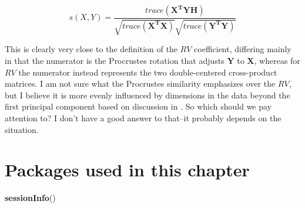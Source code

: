 \documentclass[
]{book}
\newenvironment{Shaded}{\begin{snugshade}}{\end{snugshade}}
\newcommand{\FunctionTok}[1]{\textcolor[rgb]{0.13,0.29,0.53}{\textbf{#1}}}
\newcommand{\NormalTok}[1]{#1}
\begin{document}
\[s(X,Y)=\frac{trace(\mathbf{X^TYH})}{\sqrt{trace(\mathbf{X^TX})}\sqrt{trace(\mathbf{Y^TY})}}\]

This is clearly very close to the definition of the \(RV\) coefficient, differing mainly in that the numerator is the Procrustes rotation that adjusts \(\mathbf{Y}\) to \(\mathbf{X}\), whereas for \(RV\) the numerator instead represents the two double-centered cross-product matrices. I am not sure what the Procrustes similarity emphasizes over the \(RV\), but I believe it is more evenly influenced by dimensions in the data beyond the first principal component based on discussion in \citet{tomicComparison2015}. So which should we pay attention to? I don't have a good answer to that--it probably depends on the situation.

\section{Packages used in this chapter}\label{packages-used-in-this-chapter-12}

\begin{Shaded}
\begin{Highlighting}[]
\FunctionTok{sessionInfo}\NormalTok{()}
\end{Highlighting}
\end{Shaded}
\end{document}
